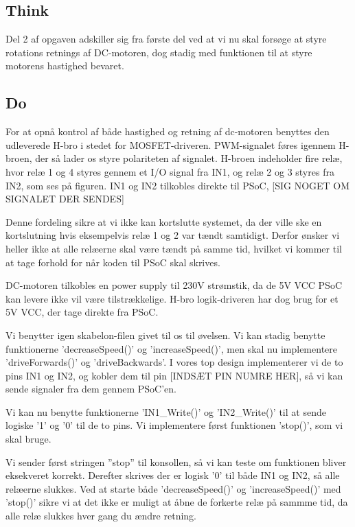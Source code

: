 \documentclass[../main.tex]{subfiles}
\begin{document}
\subsection{Think}
Del 2 af opgaven adskiller sig fra første del ved at vi nu skal forsøge at styre rotations retnings af DC-motoren, dog stadig med funktionen til at styre motorens hastighed bevaret.

\subsection{Do}
For at opnå kontrol af både hastighed og retning af dc-motoren benyttes den udleverede H-bro i stedet for MOSFET-driveren. PWM-signalet føres igennem H-broen, der så lader os styre polariteten af signalet. H-broen indeholder fire relæ, hvor relæ 1 og 4 styres gennem et I/O signal fra IN1, og relæ 2 og 3 styres fra IN2, som ses på figuren. IN1 og IN2 tilkobles direkte til PSoC, [SIG NOGET OM SIGNALET DER SENDES]


Denne fordeling sikre at vi ikke kan kortslutte systemet, da der ville ske en kortslutning hvis eksempelvis relæ 1 og 2 var tændt samtidigt. Derfor ønsker vi heller ikke at alle relæerne skal være tændt på samme tid, hvilket vi kommer til at tage forhold for når koden til PSoC skal skrives. 

DC-motoren tilkobles en power supply til 230V strømstik, da de 5V VCC PSoC kan levere ikke vil være tilstrækkelige. H-bro logik-driveren har dog brug for et 5V VCC, der tage direkte fra PSoC.

Vi benytter igen skabelon-filen givet til os til øvelsen. Vi kan stadig benytte funktionerne ’decreaseSpeed()’ og ’increaseSpeed()’, men skal nu implementere ’driveForwards()’ og ’driveBackwards’. I vores top design implementerer vi de to pins IN1 og IN2, og kobler dem til pin [INDSÆT PIN NUMRE HER], så vi kan sende signaler fra dem gennem PSoC’en.


Vi kan nu benytte funktionerne ’IN1\_Write()’ og ’IN2\_Write()’ til at sende logiske ’1’ og ’0’ til de to pins. Vi implementere først funktionen ’stop()’, som vi skal bruge.


Vi sender først stringen ”stop” til konsollen, så vi kan teste om funktionen bliver eksekveret korrekt. Derefter skrives der er logisk ’0’ til både IN1 og IN2, så alle relæerne slukkes. Ved at starte både ’decreaseSpeed()’ og ’increaseSpeed()’ med ’stop()’ sikre vi at det ikke er muligt at åbne de forkerte relæ på sammme tid, da alle relæ slukkes hver gang du ændre retning.
\end{document}
